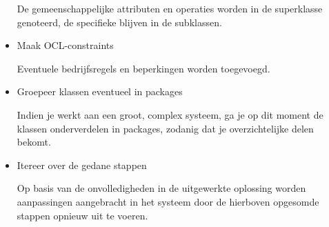 \begin{itemize}
    De gemeenschappelijke attributen en operaties worden in de superklasse genoteerd, de specifieke blijven in de subklassen.

\item Maak OCL-constraints

Eventuele bedrijfsregels en beperkingen worden toegevoegd.

\item Groepeer klassen eventueel in packages

Indien je werkt aan een groot, complex systeem, ga je op dit moment de klassen onderverdelen in packages, zodanig dat je overzichtelijke delen bekomt.
\item Itereer over de gedane stappen

Op basis van de onvolledigheden in de uitgewerkte oplossing worden aanpassingen aangebracht in het systeem door de hierboven opgesomde stappen opnieuw uit te voeren.
\end{itemize}

